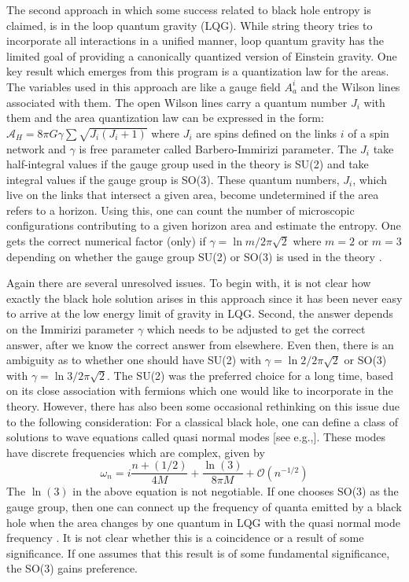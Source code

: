 \documentclass[12pt]{iopart}
\begin{document}
The second approach  in which some success related to black hole entropy is claimed, is in the  loop
quantum gravity (LQG). While string theory tries to incorporate all interactions in a unified manner, loop quantum gravity 
\cite{Rovelli:1998gg,Thiemann:2001yy}
 has the limited goal of providing a canonically quantized version of Einstein gravity. One key result which emerges from
this program is a quantization law for the areas. The variables used in this approach are like
a gauge field $A^i_a$ and the Wilson lines associated with them. The open Wilson lines carry a quantum number $J_i$ with them
and the area quantization law can be expressed in the form: $\mathcal{A}_H=8\pi G\gamma\sum \sqrt{J_i(J_i+1)}$ where $J_i$ are spins defined on the links $i$ of a spin network and $\gamma$ is free parameter called Barbero-Immirizi parameter.
The $J_i$ take half-integral values if the gauge group used in the theory is SU(2) and take integral values if the gauge group is SO(3).
These quantum numbers, $J_i$, which live on the links that intersect a given area, become undetermined if the area refers to a horizon. Using this, one can count the number of microscopic configurations contributing to a given horizon area and estimate the entropy.
One gets the correct numerical factor (only) if $\gamma=\ln m/2\pi \sqrt{2}$ where $m=2$ or $m=3$ depending on whether the gauge
group SU(2) or SO(3) is  used in the theory \cite{Krasnov:1998wc,Rovelli:1996dv,Ashtekar:2000eq,Ashtekar:1998yu}.

Again there are several unresolved issues. To begin with, it is not clear how exactly the black hole solution arises in this approach since it has been never easy to arrive at the low energy limit of gravity in LQG. Second, the answer depends on the Immirizi parameter $\gamma$ which needs to be adjusted to get the correct answer, after we know the correct answer from elsewhere.
Even then, there is an ambiguity as to whether one should have SU(2) with  $\gamma=\ln 2/2\pi \sqrt{2}$ or SO(3) with
 $\gamma=\ln 3/2\pi \sqrt{2}$. The SU(2) was the preferred choice for a long time, based on its close association with fermions
which one would like to incorporate in the theory. However,  there has also been some occasional rethinking on this issue due to the following consideration: For a classical black hole, one can define a class of solutions to wave equations called quasi normal modes [see e.g.,\cite{Corichi:2002ty,Kokkotas:1999bd,Berti:2003jh,Cardoso:2003vt}]. 
These modes have discrete frequencies 
\cite{Padmanabhan:2003fx,Choudhury:2003wd,Motl:2003cd,Motl:2002hd} which are complex, given by
\begin{equation}
\omega_n=i\frac{n+(1/2)}{4M}+\frac{\ln(3)}{8\pi M}+\mathcal{O}(n^{-1/2})
\end{equation}
The $\ln(3)$  in the above equation is not negotiable. If one chooses SO(3) as the gauge group, then one can connect up the frequency 
of quanta emitted by a black hole when the area changes by one quantum in LQG with the quasi normal mode frequency
\cite{Dreyer:2002vy,Hod:1998vk}. It is not clear whether this is a coincidence or a result of some significance. 
If one assumes that this result is of some fundamental significance, the SO(3) gains preference.
\end{document}
